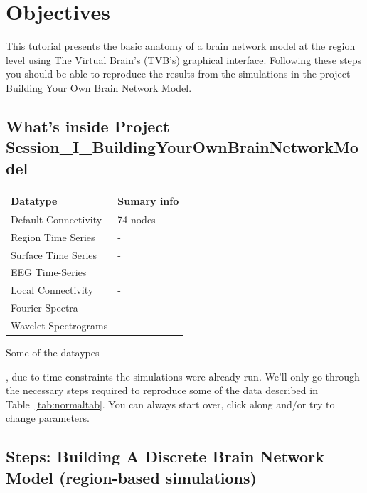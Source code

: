 \documentclass{tufte-handout}
\begin{document}
\section{Objectives}\label{sec:objectives}

This tutorial presents the basic anatomy of a brain network model at the region level using The
Virtual Brain's (TVB's) graphical interface. Following these steps you should
be able to reproduce the results from the simulations in the project Building
Your Own Brain Network Model.

\subsection{What's inside Project Session\_I\_BuildingYourOwnBrainNetworkModel}\label{sec:project_data}

\begin{margintable}
  \centering
  \selectfont
  \begin{tabular}{ll}
    \toprule
    Datatype & Sumary info                       \\
    \midrule
    Default Connectivity & 74 {nodes}            \\
    Region Time Series   & -                     \\
    Surface Time Series  & -                     \\ 
    EEG Time-Series      &                       \\
    Local Connectivity   & -                     \\
    Fourier Spectra      & -                     \\ 
    Wavelet Spectrograms & -                     \\
    \bottomrule
  \end{tabular}
  \caption{Some of the dataypes}
  \label{tab:normaltab}
\end{margintable}


, due to time constraints the simulations were
already run. We'll only go through the necessary steps required to reproduce
some of the data described in Table~\ref{tab:normaltab}. You can always start
over, click along and/or try to change parameters.


\subsection{Steps: Building A Discrete Brain Network Model (region-based simulations)}\label{sec:steps}
\end{document}
